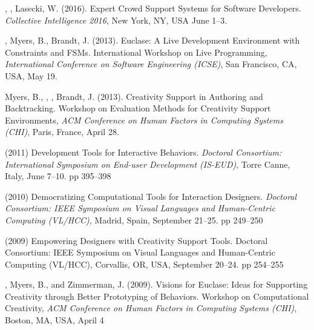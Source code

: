  {
    , , Lasecki, W. (2016). Expert Crowd Support Systems for Software Developers. \textit{Collective Intelligence 2016}, New York, NY, USA June 1--3.
}

 {
    , Myers, B., Brandt, J. (2013). Euclase: A Live Development Environment with Constraints and FSMs. International Workshop on Live Programming, \textit{International Conference on Software Engineering (ICSE)}, San Francisco, CA, USA, May 19.
}

 {
    Myers, B., , , Brandt, J. (2013). Creativity Support in Authoring and Backtracking. Workshop on Evaluation Methods for Creativity Support Environments, \textit{ACM Conference on Human Factors in Computing Systems (CHI)}, Paris, France, April 28.
}

 {
     (2011) Development Tools for Interactive Behaviors. \textit{Doctoral Consortium: International Symposium on End-user Development (IS-EUD)}, Torre Canne, Italy, June 7--10. pp 395--398
}

 {
     (2010) Democratizing Computational Tools for Interaction Designers. \textit{Doctoral Consortium: IEEE Symposium on Visual Languages and Human-Centric Computing (VL/HCC)}, Madrid, Spain, September 21--25. pp 249--250
}

 {
     (2009) Empowering Designers with Creativity Support Tools. Doctoral Consortium: IEEE Symposium on Visual Languages and Human-Centric Computing (VL/HCC), Corvallis, OR, USA, September 20--24. pp 254--255
}

 {
    , Myers, B., and Zimmerman, J. (2009). Visions for Euclase: Ideas for Supporting Creativity through Better Prototyping of Behaviors. Workshop on Computational Creativity, \textit{ACM Conference on Human Factors in Computing Systems (CHI)}, Boston, MA, USA, April 4
}

